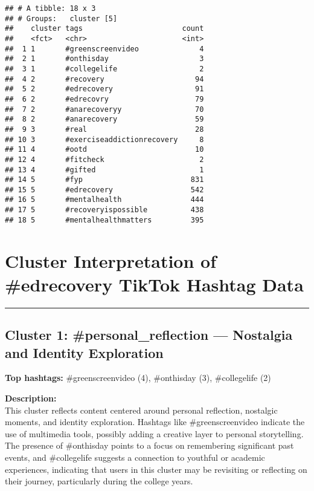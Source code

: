 \documentclass[
]{article}
\begin{document}
\begin{verbatim}
## # A tibble: 18 x 3
## # Groups:   cluster [5]
##    cluster tags                       count
##    <fct>   <chr>                      <int>
##  1 1       #greenscreenvideo              4
##  2 1       #onthisday                     3
##  3 1       #collegelife                   2
##  4 2       #recovery                     94
##  5 2       #edrecovery                   91
##  6 2       #edrecovry                    79
##  7 2       #anarecoveryy                 70
##  8 2       #anarecovery                  59
##  9 3       #real                         28
## 10 3       #exerciseaddictionrecovery     8
## 11 4       #ootd                         10
## 12 4       #fitcheck                      2
## 13 4       #gifted                        1
## 14 5       #fyp                         831
## 15 5       #edrecovery                  542
## 16 5       #mentalhealth                444
## 17 5       #recoveryispossible          438
## 18 5       #mentalhealthmatters         395
\end{verbatim}

\section{Cluster Interpretation of \#edrecovery TikTok Hashtag
Data}\label{cluster-interpretation-of-edrecovery-tiktok-hashtag-data}

\begin{center}\rule{0.5\linewidth}{0.5pt}\end{center}

\subsection{Cluster 1: \#personal\_reflection --- Nostalgia and Identity
Exploration}\label{cluster-1-personal_reflection-nostalgia-and-identity-exploration}

\textbf{Top hashtags:} \#greenscreenvideo (4), \#onthisday (3),
\#collegelife (2)

\textbf{Description:}\\

This cluster reflects content centered around personal reflection,
nostalgic moments, and identity exploration. Hashtags like
\#greenscreenvideo indicate the use of multimedia tools, possibly adding
a creative layer to personal storytelling. The presence of \#onthisday
points to a focus on remembering significant past events, and
\#collegelife suggests a connection to youthful or academic experiences,
indicating that users in this cluster may be revisiting or reflecting on
their journey, particularly during the college years.
\end{document}
